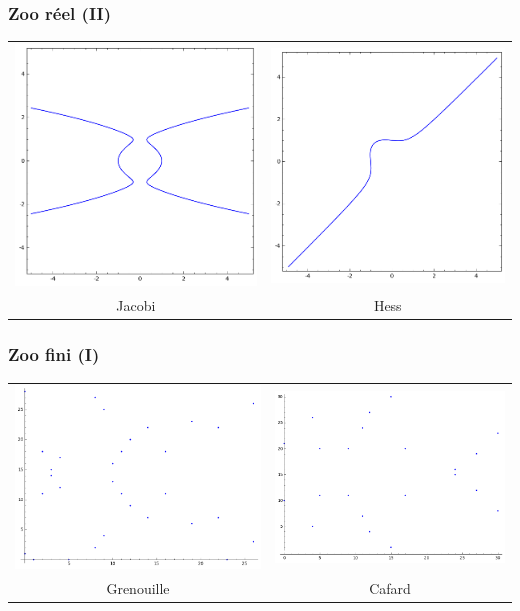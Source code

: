 \documentclass[francais]{beamer}
\begin{document}
\begin{frame}\frametitle{Zoo réel (II)}
\begin{center}
\begin{tabular}{cc}
\includegraphics[width=.4\hsize]{jacobi} & \includegraphics[width=.4\hsize]{hessian} \\
Jacobi & Hess \\
\end{tabular}
\end{center}
\end{frame}

\begin{frame}\frametitle{Zoo fini (I)}
\begin{center}
\begin{tabular}{cc}
\includegraphics[width=.45\hsize]{frog} & \includegraphics[width=.45\hsize]{cockroach} \\
Grenouille & Cafard \\
\end{tabular}
\end{center}
\end{frame}
\end{document}
